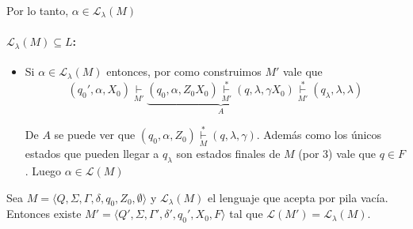 \begin{demoPart}[0.8\textwidth]
\begin{itemize}
      Por lo tanto, \(\alpha\in \mathcal{L}_\lambda(M)\)
  \end{itemize}

  \paragraph{\(\mathcal{L}_\lambda(M) \subseteq L\):}
  \begin{itemize}
    \item[] Si \(\alpha\in \mathcal{L}_\lambda(M)\) entonces, por como construimos \(M'\) vale que \[(q_0', \alpha, X_0) \underset{M'}{\vdash} \underbrace{(q_0, \alpha, Z_0X_0) \underset{M'}{\overset{*}{\vdash}} (q,\lambda, \gamma X_0)}_{A} \underset{M'}{\overset{*}{\vdash}} (q_\lambda, \lambda, \lambda)\]

      De \(A\) se puede ver que \((q_0,\alpha, Z_0) \underset{M}{\overset{*}{\vdash}} (q,\lambda, \gamma)\). Además como los únicos estados que pueden llegar a \(q_\lambda\) son estados finales de \(M\) (por 3) vale que \(q\in F\). Luego \(\alpha\in \mathcal{L}(M)\)
  \end{itemize}
\end{demoPart}

\begin{teorema}
  Sea \(M=\langle Q, \Sigma, \Gamma, \delta, q_0, Z_0, \emptyset \rangle\) y \(\mathcal{L}_\lambda(M)\) el lenguaje que acepta por pila vacía. Entonces existe \(M'= \langle Q', \Sigma, \Gamma', \delta', q_0', X_0, F \rangle\) tal que \(\mathcal{L}(M') = \mathcal{L}_\lambda(M)\).
\end{teorema}

